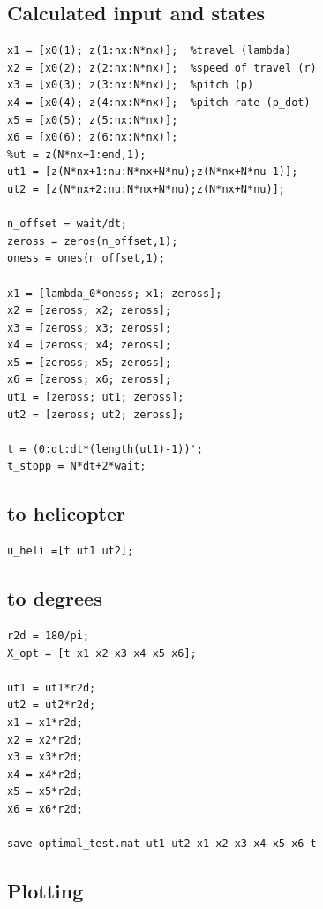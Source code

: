 \documentclass[11pt,a4paper,USenglish]{article} %
\begin{document}
\subsection*{Calculated input and states}

\begin{verbatim}
x1 = [x0(1); z(1:nx:N*nx)];  %travel (lambda)
x2 = [x0(2); z(2:nx:N*nx)];  %speed of travel (r)
x3 = [x0(3); z(3:nx:N*nx)];  %pitch (p)
x4 = [x0(4); z(4:nx:N*nx)];  %pitch rate (p_dot)
x5 = [x0(5); z(5:nx:N*nx)];
x6 = [x0(6); z(6:nx:N*nx)];
%ut = z(N*nx+1:end,1);
ut1 = [z(N*nx+1:nu:N*nx+N*nu);z(N*nx+N*nu-1)];
ut2 = [z(N*nx+2:nu:N*nx+N*nu);z(N*nx+N*nu)];

n_offset = wait/dt;
zeross = zeros(n_offset,1);
oness = ones(n_offset,1);

x1 = [lambda_0*oness; x1; zeross];
x2 = [zeross; x2; zeross];
x3 = [zeross; x3; zeross];
x4 = [zeross; x4; zeross];
x5 = [zeross; x5; zeross];
x6 = [zeross; x6; zeross];
ut1 = [zeross; ut1; zeross];
ut2 = [zeross; ut2; zeross];

t = (0:dt:dt*(length(ut1)-1))';
t_stopp = N*dt+2*wait;
\end{verbatim}


\subsection*{to helicopter}

\begin{verbatim}
u_heli =[t ut1 ut2];
\end{verbatim}


\subsection*{to degrees}

\begin{verbatim}
r2d = 180/pi;
X_opt = [t x1 x2 x3 x4 x5 x6];

ut1 = ut1*r2d;
ut2 = ut2*r2d;
x1 = x1*r2d;
x2 = x2*r2d;
x3 = x3*r2d;
x4 = x4*r2d;
x5 = x5*r2d;
x6 = x6*r2d;

save optimal_test.mat ut1 ut2 x1 x2 x3 x4 x5 x6 t
\end{verbatim}


\subsection*{Plotting}
\end{document}
